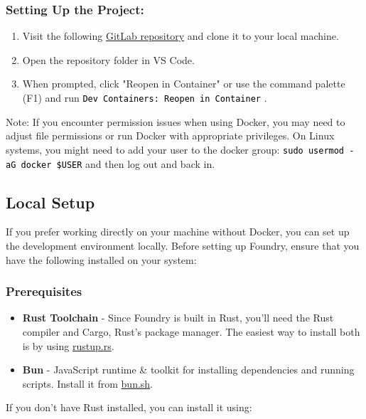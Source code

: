 \documentclass[12pt]{article}
\newcommand{\codegrey}[1]{%
  \texttt{\colorbox{black!4}{\textcolor{black}{#1}}}%
}
\begin{document}
\subsubsection*{Setting Up the Project:}

\begin{enumerate}
  \item Visit the following \href{https://gitlab.fel.cvut.cz/radovluk/smart-contracts-exercises/-/tree/foundry/01-Hello-Blockchain-World/task/task-code}{GitLab repository} and clone it to your local machine.
  \item Open the repository folder in VS Code.
  \item When prompted, click "Reopen in Container" or use the command palette (F1) and run \codegrey{Dev Containers: Reopen in Container}.
\end{enumerate}

\noindent
Note: If you encounter permission issues when using Docker, you may need to adjust file permissions or run Docker with appropriate privileges. On Linux systems, you might need to add your user to the docker group: \codegrey{sudo usermod -aG docker \$USER} and then log out and back in.

\subsection{Local Setup}

If you prefer working directly on your machine without Docker, you can set up the development environment locally. Before setting up Foundry, ensure that you have the following installed on your system:

\subsubsection*{Prerequisites}
\begin{itemize}
    \item \textbf{Rust Toolchain} - Since Foundry is built in Rust, you'll need the Rust compiler and Cargo, Rust's package manager. The easiest way to install both is by using \href{https://rustup.rs/}{rustup.rs}.
    \item \textbf{Bun} - JavaScript runtime \& toolkit for installing dependencies and running scripts. Install it from \href{https://bun.sh/}{bun.sh}.
\end{itemize}

\noindent
If you don't have Rust installed, you can install it using:
\end{document}
